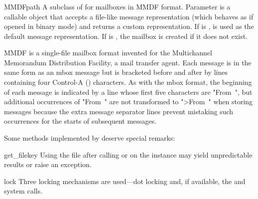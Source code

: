 \begin{seealso}
\end{seealso}

\subsubsection{}
\label{mailbox-mmdf}

\begin{classdesc}{MMDF}{path}
A subclass of  for mailboxes in MMDF format. Parameter
 is a callable object that accepts a file-like message
representation (which behaves as if opened in binary mode) and returns a custom
representation. If  is ,  is used as
the default message representation. If  is , the mailbox
is created if it does not exist.
\end{classdesc}

MMDF is a single-file mailbox format invented for the Multichannel Memorandum
Distribution Facility, a mail transfer agent. Each message is in the same form
as an mbox message but is bracketed before and after by lines containing four
Control-A () characters. As with the mbox format,
the beginning of each message is indicated by a line whose first five
characters are "From~", but additional occurrences of "From~" are not
transformed to ">From~" when storing messages because the extra message
separator lines prevent mistaking such occurrences for the starts of subsequent
messages.

Some  methods implemented by  deserve special
remarks:

\begin{methoddesc}{get_file}{key}
Using the file after calling  or  on the
 instance may yield unpredictable results or raise an exception.
\end{methoddesc}

\begin{methoddesc}{lock}{}
Three locking mechanisms are used---dot locking and, if available, the
 and  system calls.
\end{methoddesc}

